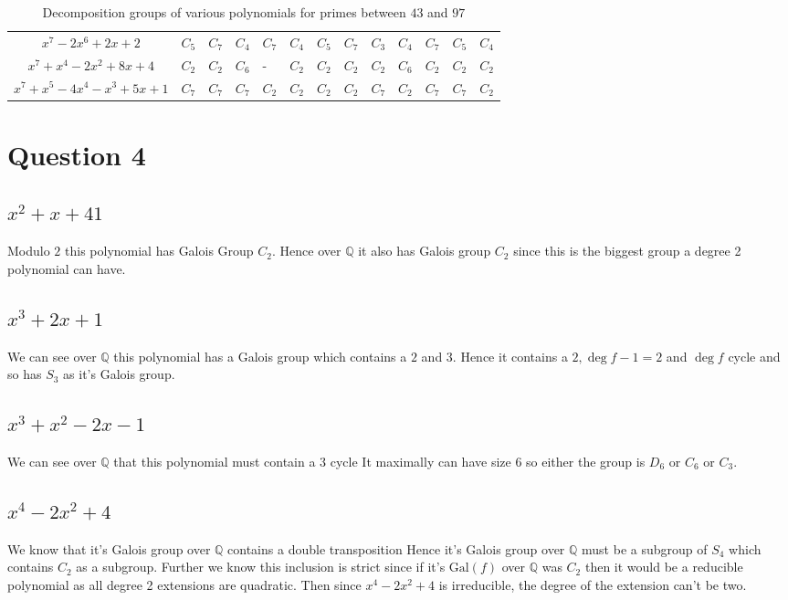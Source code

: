 \documentclass{article}
\begin{document}
\begin{table}[hp]
\begin{center}
\begin{tabular}{|c|llllllllllll|}
$ x^7 - 2x^6 + 2x + 2 $            & $C_5$ & $C_7$ & $C_4$ & $C_7$ & $C_4$ & $C_5$ & $C_7$ & $C_3$ & $C_4$ & $C_7$ & $C_5$ & $C_4$ \\
$ x^7 + x^4 - 2x^2 + 8x + 4 $      & $C_2$ & $C_2$ & $C_6$ & -   & $C_2$ & $C_2$ & $C_2$ & $C_2$ & $C_6$ & $C_2$ & $C_2$ & $C_2$ \\
$ x^7 + x^5 - 4x^4 - x^3 + 5x + 1$ & $C_7$ & $C_7$ & $C_7$ & $C_2$ & $C_2$ & $C_2$ & $C_2$ & $C_7$ & $C_2$ & $C_7$ & $C_7$ & $C_2$ \\ \hline
\end{tabular}
\caption{ Decomposition groups of various polynomials for primes between $43$ and $97$}
\end{center}
\end{table}

\section{Question 4}
\subsection{$x^2+x+41$}
Modulo $2$ this polynomial has Galois Group $C_2$. Hence over $\mathbb{Q}$ it also has Galois group $C_2$ since this is the biggest group a degree 2 polynomial can have.
\subsection{$x^3+2x+1$    }
We can see over $\mathbb{Q}$ this polynomial has a Galois group which contains a $2$ and $3$.  Hence it contains a $2,\deg f-1=2$ and $\deg f$ cycle and so has $S_3$ as it's Galois group.



\subsection{$x^3+x^2-2x-1$    }
We can see over $\mathbb{Q}$ that this polynomial must contain a $3$ cycle  It maximally can have size $6$ so either the group is $D_6$ or $C_6$ or $C_3$.


\subsection{$x^4-2x^2+4$  }

We know that it's Galois group over $\mathbb{Q}$ contains a double transposition  Hence it's Galois group over $\mathbb{Q}$ must be a subgroup of $S_4$ which contains $C_2$ as a subgroup.  Further we know this inclusion is strict since if it's $\text{Gal} (f)$ over $\mathbb{Q}$ was $C_2$ then it would be a reducible polynomial as all degree 2 extensions are quadratic.  Then since $x^4-2x^2+4$ is irreducible, the degree of the extension can't be two. 
\end{document}
